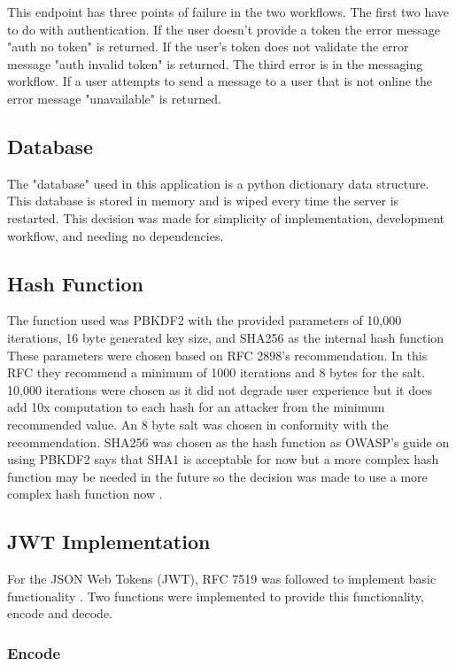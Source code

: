 This endpoint has three points of failure in the two workflows. The first two have to do with authentication. If the user doesn't provide a token the error message "auth no token" is returned. If the user's token does not validate the error message "auth invalid token" is returned. The third error is in the messaging workflow. If a user attempts to send a message to a user that is not online the error message "unavailable" is returned.


\subsection{Database}


The "database" used in this application is a python dictionary data structure. This database is stored in memory and is wiped every time the server is restarted. This decision was made for simplicity of implementation, development workflow, and needing no dependencies. 


\subsection{Hash Function}


The function used was PBKDF2 with the provided parameters of 10,000 iterations, 16 byte generated key size, and SHA256 as the internal hash function \cite{pkcs-rfc}\cite{dsa-rfc} These parameters were chosen based on RFC 2898's recommendation. In this RFC they recommend a minimum of 1000 iterations and 8 bytes for the salt. 10,000 iterations were chosen as it did not degrade user experience but it does add 10x computation to each hash for an attacker from the minimum recommended value. An 8 byte salt was chosen in conformity with the recommendation. SHA256 was chosen as the hash function as OWASP's guide on using PBKDF2 says that SHA1 is acceptable for now but a more complex hash function may be needed in the future so the decision was made to use a more complex hash function now \cite{owasp-pbkdf}.


\subsection{JWT Implementation}


For the JSON Web Tokens (JWT), RFC 7519 was followed to implement basic functionality \cite{jwt-rfc}. Two functions were implemented to provide this functionality, encode and decode.


\subsubsection{Encode}


